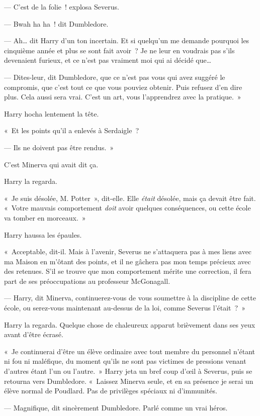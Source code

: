 --- C'est de la folie~! explosa Severus.

--- Bwah ha ha~! dit Dumbledore.

--- Ah… dit Harry d'un ton incertain.
Et si quelqu'un me demande pourquoi les cinquième année et plus se sont fait avoir~?
Je ne leur en voudrais pas s'ils devenaient furieux, et ce n'est pas vraiment moi qui ai décidé que…

--- Dites-leur, dit Dumbledore, que ce n'est pas vous qui avez suggéré le compromis, que c'est tout ce que vous pouviez obtenir.
Puis refusez d'en dire plus.
Cela aussi sera vrai.
C'est un art, vous l'apprendrez avec la pratique.~»

Harry hocha lentement la tête.

«~Et les points qu'il a enlevés à Serdaigle~?

--- Ils ne doivent pas être rendus.~»

C'est Minerva qui avait dit ça.

Harry la regarda.

«~Je suis désolée, M. Potter~», dit-elle.
Elle \emph{était} désolée, mais ça devait être fait.
«~Votre mauvais comportement \emph{doit} avoir quelques conséquences, ou cette école va tomber en morceaux.~»

Harry haussa les épaules.

«~Acceptable, dit-il.
Mais à l'avenir, Severus ne s'attaquera pas à mes liens avec ma Maison en m'ôtant des points, et il ne gâchera pas mon temps précieux avec des retenues.
S'il se trouve que mon comportement mérite une correction, il fera part de ses préoccupations au professeur McGonagall.

--- Harry, dit Minerva, continuerez-vous de vous soumettre à la discipline de cette école, ou serez-vous maintenant au-dessus de la loi, comme Severus l'était~?~»

Harry la regarda.
Quelque chose de chaleureux apparut brièvement dans ses yeux avant d'être écrasé.

«~Je continuerai d'être un élève ordinaire avec tout membre du personnel n'étant ni fou ni maléfique, du moment qu'ils ne sont pas victimes de pressions venant d'autres étant l'un ou l'autre.~»
Harry jeta un bref coup d'œil à Severus, puis se retourna vers Dumbledore.
«~Laissez Minerva seule, et en sa présence je serai un élève normal de Poudlard.
Pas de privilèges spéciaux ni d'immunités.

--- Magnifique, dit sincèrement Dumbledore.
Parlé comme un vrai héros.

